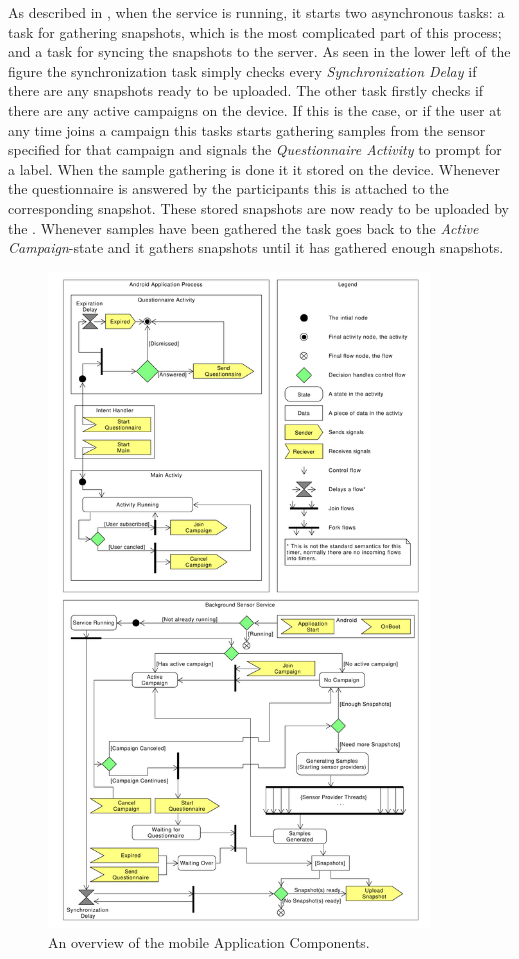 As described in , when the service is running, it starts two asynchronous tasks: a task for gathering snapshots, which is the most complicated part of this process; and a task for syncing the snapshots to the server. As seen in the lower left of the figure the synchronization task simply checks every \emph{Synchronization Delay} if there are any snapshots ready to be uploaded. The other task firstly checks if there are any active campaigns on the device. If this is the case, or if the user at any time joins a campaign this tasks starts gathering samples from the sensor specified for that campaign and signals the \emph{Questionnaire Activity} to prompt for a label. When the sample gathering is done it it stored on the device. Whenever the questionnaire is answered by the participants this is attached to the corresponding snapshot. These stored snapshots are now ready to be uploaded by the . Whenever samples have been gathered the task goes back to the \emph{Active Campaign}-state and it gathers snapshots until it has gathered enough snapshots.

\begin{figure}[!htbp]
    \centering
    \includegraphics[width=0.9\textwidth]{graphic/backgroundsensorservice/lifecyclestuff}
    \caption{An overview of the mobile Application Components.}
    \label{fig:system_currency_and_lifecycle}
\end{figure}
\FloatBarrier